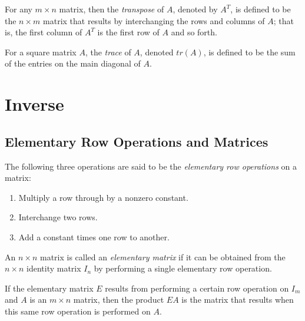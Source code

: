 \documentclass{report}
\begin{document}
			\begin{defn}[Transpose]
				For any $m \times n$ matrix, then the \emph{transpose} of $A$, denoted by $A^T$, is defined to be the $n \times m$ matrix that results by interchanging the rows and columns of $A$; that is, the first column of $A^T$ is the first row of $A$ and so forth.
			\end{defn}
			
			\begin{defn}[Trace]
				For a square matrix $A$, the \emph{trace} of $A$, denoted $tr(A)$, is defined to be the sum of the entries on the main diagonal of $A$.
			
		\end{defn}
	
	\section{Inverse}
		\subsection{Elementary Row Operations and Matrices}
		
		\begin{defn}\label{def_elementary_row_operations}
			The following three operations are said to be the \emph{elementary row operations} on a matrix:
			\begin{enumerate}
				\item Multiply a row through by a nonzero constant.
				\item Interchange two rows.
				\item Add a constant times one row to another.
			\end{enumerate}
		\end{defn}
		
		\begin{defn}
			An $n \times n$ matrix is called an \emph{elementary matrix} if it can be obtained from the $n \times n$ identity matrix $I_n$ by performing a single elementary row operation.
		\end{defn}
		
		\begin{thm}
			If the elementary matrix $E$ results from performing a certain row operation on $I_m$ and $A$ is an $m \times n$ matrix, then the product $EA$ is the matrix that results when this same row operation is performed on $A$.
		\end{thm}
		
\end{document}
